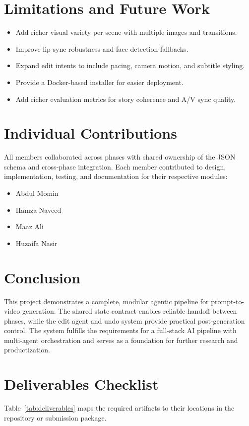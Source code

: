 \documentclass[11pt]{article}
\begin{document}
\section{Limitations and Future Work}
\begin{itemize}
  \item Add richer visual variety per scene with multiple images and transitions.
  \item Improve lip-sync robustness and face detection fallbacks.
  \item Expand edit intents to include pacing, camera motion, and subtitle styling.
  \item Provide a Docker-based installer for easier deployment.
  \item Add richer evaluation metrics for story coherence and A/V sync quality.
\end{itemize}

\section{Individual Contributions}
All members collaborated across phases with shared ownership of the JSON schema and cross-phase integration. Each member contributed to design, implementation, testing, and documentation for their respective modules:
\begin{itemize}
  \item Abdul Momin
  \item Hamza Naveed
  \item Maaz Ali
  \item Huzaifa Nasir
\end{itemize}

\section{Conclusion}
This project demonstrates a complete, modular agentic pipeline for prompt-to-video generation. The shared state contract enables reliable handoff between phases, while the edit agent and undo system provide practical post-generation control. The system fulfills the requirements for a full-stack AI pipeline with multi-agent orchestration and serves as a foundation for further research and productization.

\section{Deliverables Checklist}
Table~\ref{tab:deliverables} maps the required artifacts to their locations in the repository or submission package.
\end{document}
